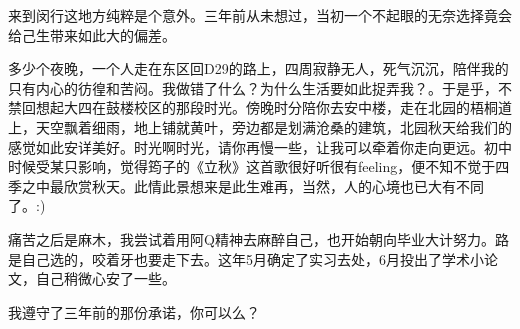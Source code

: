 
\begin{thanks}

来到闵行这地方纯粹是个意外。三年前从未想过，当初一个不起眼的无奈选择竟会给己生带来如此大的偏差。

多少个夜晚，一个人走在东区回D29的路上，四周寂静无人，死气沉沉，陪伴我的只有内心的彷徨和苦闷。我做错了什么？为什么生活要如此捉弄我？。于是乎，不禁回想起大四在鼓楼校区的那段时光。傍晚时分陪你去安中楼，走在北园的梧桐道上，天空飘着细雨，地上铺就黄叶，旁边都是划满沧桑的建筑，北园秋天给我们的感觉如此安详美好。时光啊时光，请你再慢一些，让我可以牵着你走向更远。初中时候受某只影响，觉得筠子的《立秋》这首歌很好听很有feeling，便不知不觉于四季之中最欣赏秋天。此情此景想来是此生难再，当然，人的心境也已大有不同了。:)

痛苦之后是麻木，我尝试着用阿Q精神去麻醉自己，也开始朝向毕业大计努力。路是自己选的，咬着牙也要走下去。这年5月确定了实习去处，6月投出了学术小论文，自己稍微心安了一些。

我遵守了三年前的那份承诺，你可以么？

\end{thanks}

